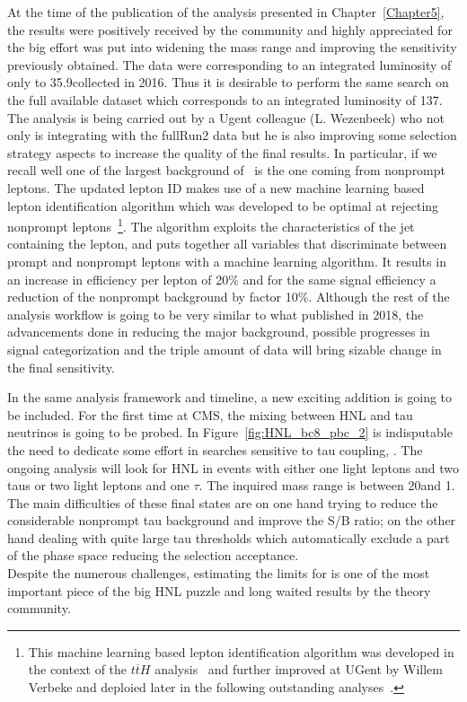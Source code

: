 At the time of the publication of the analysis presented in
Chapter~\ref{Chapter5}, the results were positively received by the community and highly appreciated
for the big effort was put into widening the mass range and
improving the sensitivity previously obtained. The
data were corresponding to an integrated luminosity of only to
35.9\fbinv collected in 2016. Thus it is desirable to perform the same
search on the full available dataset which corresponds to an integrated luminosity of 
137\fbinv. \\
The analysis is being carried out by a Ugent colleague (L. Wezenbeek)
who not only is integrating with the fullRun2 data but he is also improving
some selection strategy aspects to increase the quality of the final
results. In particular, if we recall well one of the largest
background of~\cite{Sirunyan:2018mtv} is the one coming from nonprompt
leptons. The updated lepton ID makes use of a new machine learning
based lepton identification algorithm which was developed to be
optimal at rejecting nonprompt leptons~\footnote{This machine learning
based lepton identification algorithm was developed in the context of
the $t\overline{t}H$ analysis~\cite{Sirunyan_2018_ttH} and further improved at UGent by Willem
Verbeke and deploied later in the following outstanding
analyses~\cite{CMS:2018sgc_tzq, Sirunyan_2021_higgsmumu}.}. The algorithm exploits the
characteristics of the jet containing the lepton, and puts together all
variables that discriminate between prompt and
nonprompt leptons with a machine learning algorithm. It results in an increase in efficiency
per lepton of 20\% and for the same signal
efficiency a reduction of the
nonprompt background
by factor 10\%. Although the rest of the analysis workflow is going to be very
similar to what published in 2018, the advancements done in reducing the
major background, possible progresses in signal categorization and the
triple amount of data will bring sizable change in the final
sensitivity.

In the same analysis framework and timeline, a new exciting addition
is going to be included. For the first time at CMS, the mixing between
HNL and tau neutrinos is going to be probed. In
Figure~\ref{fig:HNL_bc8_pbc_2} is indisputable the need to dedicate
some effort in searches sensitive to tau coupling, \mixpart. The
ongoing analysis will look for HNL in events with either one light leptons
and two taus or two light leptons and one $\tau$. The inquired mass
range is between 20\GeV and 1\TeV. The main difficulties of these final
states are on one hand trying to reduce the considerable nonprompt tau background and
improve the S/B ratio; on the other hand dealing with quite large tau
\pt thresholds which automatically exclude a part of the phase space
reducing the selection acceptance. \\
Despite the numerous challenges, estimating the limits for \mixpart is
one of the most important piece of the big HNL puzzle and long waited results
by the theory community.  

